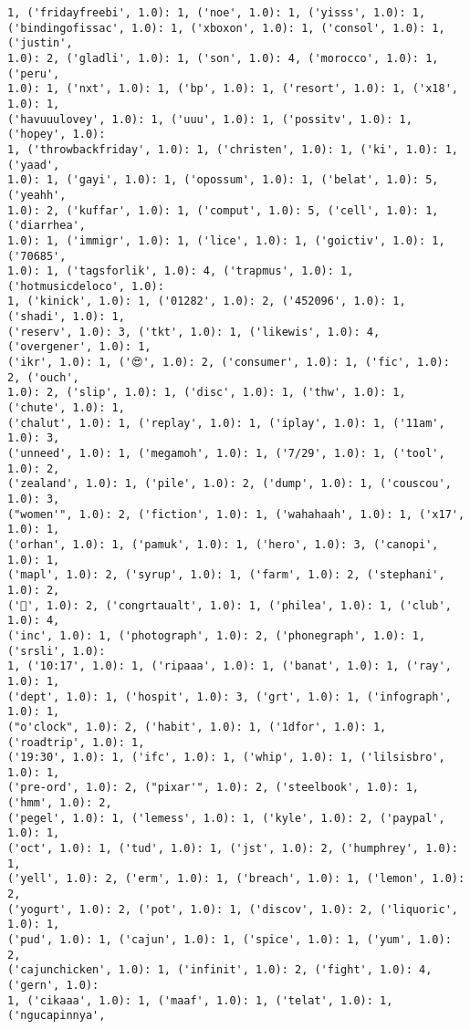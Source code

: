 \documentclass[11pt]{article}
\begin{document}
\begin{Verbatim}[commandchars=\\\{\}]
1, ('fridayfreebi', 1.0): 1, ('noe', 1.0): 1, ('yisss', 1.0): 1,
('bindingofissac', 1.0): 1, ('xboxon', 1.0): 1, ('consol', 1.0): 1, ('justin',
1.0): 2, ('gladli', 1.0): 1, ('son', 1.0): 4, ('morocco', 1.0): 1, ('peru',
1.0): 1, ('nxt', 1.0): 1, ('bp', 1.0): 1, ('resort', 1.0): 1, ('x18', 1.0): 1,
('havuuulovey', 1.0): 1, ('uuu', 1.0): 1, ('possitv', 1.0): 1, ('hopey', 1.0):
1, ('throwbackfriday', 1.0): 1, ('christen', 1.0): 1, ('ki', 1.0): 1, ('yaad',
1.0): 1, ('gayi', 1.0): 1, ('opossum', 1.0): 1, ('belat', 1.0): 5, ('yeahh',
1.0): 2, ('kuffar', 1.0): 1, ('comput', 1.0): 5, ('cell', 1.0): 1, ('diarrhea',
1.0): 1, ('immigr', 1.0): 1, ('lice', 1.0): 1, ('goictiv', 1.0): 1, ('70685',
1.0): 1, ('tagsforlik', 1.0): 4, ('trapmus', 1.0): 1, ('hotmusicdeloco', 1.0):
1, ('kinick', 1.0): 1, ('01282', 1.0): 2, ('452096', 1.0): 1, ('shadi', 1.0): 1,
('reserv', 1.0): 3, ('tkt', 1.0): 1, ('likewis', 1.0): 4, ('overgener', 1.0): 1,
('ikr', 1.0): 1, ('😍', 1.0): 2, ('consumer', 1.0): 1, ('fic', 1.0): 2, ('ouch',
1.0): 2, ('slip', 1.0): 1, ('disc', 1.0): 1, ('thw', 1.0): 1, ('chute', 1.0): 1,
('chalut', 1.0): 1, ('replay', 1.0): 1, ('iplay', 1.0): 1, ('11am', 1.0): 3,
('unneed', 1.0): 1, ('megamoh', 1.0): 1, ('7/29', 1.0): 1, ('tool', 1.0): 2,
('zealand', 1.0): 1, ('pile', 1.0): 2, ('dump', 1.0): 1, ('couscou', 1.0): 3,
("women'", 1.0): 2, ('fiction', 1.0): 1, ('wahahaah', 1.0): 1, ('x17', 1.0): 1,
('orhan', 1.0): 1, ('pamuk', 1.0): 1, ('hero', 1.0): 3, ('canopi', 1.0): 1,
('mapl', 1.0): 2, ('syrup', 1.0): 1, ('farm', 1.0): 2, ('stephani', 1.0): 2,
('💖', 1.0): 2, ('congrtaualt', 1.0): 1, ('philea', 1.0): 1, ('club', 1.0): 4,
('inc', 1.0): 1, ('photograph', 1.0): 2, ('phonegraph', 1.0): 1, ('srsli', 1.0):
1, ('10:17', 1.0): 1, ('ripaaa', 1.0): 1, ('banat', 1.0): 1, ('ray', 1.0): 1,
('dept', 1.0): 1, ('hospit', 1.0): 3, ('grt', 1.0): 1, ('infograph', 1.0): 1,
("o'clock", 1.0): 2, ('habit', 1.0): 1, ('1dfor', 1.0): 1, ('roadtrip', 1.0): 1,
('19:30', 1.0): 1, ('ifc', 1.0): 1, ('whip', 1.0): 1, ('lilsisbro', 1.0): 1,
('pre-ord', 1.0): 2, ("pixar'", 1.0): 2, ('steelbook', 1.0): 1, ('hmm', 1.0): 2,
('pegel', 1.0): 1, ('lemess', 1.0): 1, ('kyle', 1.0): 2, ('paypal', 1.0): 1,
('oct', 1.0): 1, ('tud', 1.0): 1, ('jst', 1.0): 2, ('humphrey', 1.0): 1,
('yell', 1.0): 2, ('erm', 1.0): 1, ('breach', 1.0): 1, ('lemon', 1.0): 2,
('yogurt', 1.0): 2, ('pot', 1.0): 1, ('discov', 1.0): 2, ('liquoric', 1.0): 1,
('pud', 1.0): 1, ('cajun', 1.0): 1, ('spice', 1.0): 1, ('yum', 1.0): 2,
('cajunchicken', 1.0): 1, ('infinit', 1.0): 2, ('fight', 1.0): 4, ('gern', 1.0):
1, ('cikaaa', 1.0): 1, ('maaf', 1.0): 1, ('telat', 1.0): 1, ('ngucapinnya',

\end{Verbatim}
\end{document}
